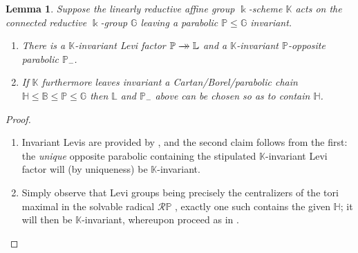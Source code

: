 \documentclass[11pt,leqno]{article}
\theoremstyle{plain}
\newtheorem{lemma}{Lemma}[section]
\theoremstyle{plain}
\theoremstyle{plain}
\numberwithin{equation}{section}
\theoremstyle{nonumberplain}
\newtheorem{proof}{Proof}
\newcommand\bB{{\mathbb B}}
\newcommand\bG{{\mathbb G}}
\newcommand\bH{{\mathbb H}}
\newcommand\bK{{\mathbb K}}
\newcommand\bL{{\mathbb L}}
\newcommand\bP{{\mathbb P}}
\newcommand\cR{{\mathcal R}}
\newcommand\1{{\bf 1}}
\newcommand{\xrightarrowdbl}[2][]{%
  \xrightarrow[#1]{#2}\mathrel{\mkern-14mu}\rightarrow
}
\begin{document}
\begin{lemma}\label{le:k.inv.levi}
  Suppose the linearly reductive affine group $\Bbbk$-scheme $\bK$ acts on the connected reductive $\Bbbk$-group $\bG$ leaving a parabolic $\bP\le \bG$ invariant.
  \begin{enumerate}[(1),wide]
  \item\label{item:le:k.inv.levi:no.h} There is a $\bK$-invariant Levi factor $\bP\xrightarrowdbl{}\bL$ and a $\bK$-invariant $\bP$-opposite parabolic $\bP_{-}$.
  \item\label{item:le:k.inv.levi:h} If $\bK$ furthermore leaves invariant a Cartan/Borel/parabolic chain $\bH\le \bB\le \bP\le \bG$ then $\bL$ and $\bP_{-}$ above can be chosen so as to contain $\bH$. 
  \end{enumerate}
\end{lemma}
\begin{proof}
  \begin{enumerate}[label={},wide]
  \item\textbf{} Invariant Levis are provided by \cite[Proposition 6.1]{MR651417}, and the second claim follows from the first: the \emph{unique} \cite[Proposition IV.14.21(i)]{brl} opposite parabolic containing the stipulated $\bK$-invariant Levi factor will (by uniqueness) be $\bK$-invariant.

  \item\textbf{} Simply observe that Levi groups being precisely the centralizers of the tori maximal in the solvable radical $\cR\bP$ \cite[Proposition IV.11.23(ii)]{brl}, exactly one such contains the given $\bH$; it will then be $\bK$-invariant, whereupon proceed as in . 
  \end{enumerate}
\end{proof}
\end{document}
